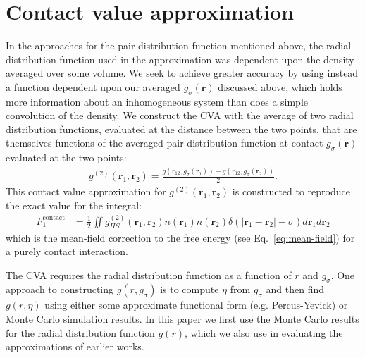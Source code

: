 \documentclass[letterpaper,twocolumn,amsmath,amssymb,pre,aps,10pt]{revtex4-1}
\newcommand{\rr}{\textbf{r}}
\begin{document}
\section{Contact value approximation}
In the approaches for the pair distribution function mentioned above,
the radial distribution function used in the approximation
was dependent upon the density averaged over some volume.  We seek to
achieve greater accuracy by using instead a function dependent upon
our averaged $g_{\sigma}(\rr)$ discussed above, which holds more
information about an inhomogeneous system than does a simple
convolution of the density.
%
We construct the CVA with the average of two radial distribution
functions, evaluated at the distance between the two points, that are
themselves functions of the averaged pair distribution function at contact
$g_{\sigma}(\rr)$ evaluated at the two points:
%
\begin{align}
  g^{(2)}(\rr_1,\rr_2) = \frac{g(r_{12}, g_\sigma(\rr_1)) +
    g(r_{12}, g_\sigma(\rr_2))}{2}. \label{eq:g2-our-mean}
\end{align}
This contact value approximation for $g^{(2)}(\rr_1,\rr_2)$ is
constructed to reproduce the exact value for the integral:
\begin{align}
  F_1^{\text{contact}} &= \tfrac12 \iint
  g^{(2)}_{HS}(\rr_1,\rr_2)n(\rr_1)n(\rr_2)\delta(|\rr_1-\rr_2|-\sigma)
  d\rr_1d\rr_2
  \label{eq:mean-field-contact}
\end{align}
which is the mean-field correction to the free energy (see
Eq.~\ref{eq:mean-field}) for a purely contact interaction.

The CVA requires the radial distribution function as a function of $r$
and $g_\sigma$.  One approach to constructing $g(r,g_\sigma)$ is to
compute $\eta$ from $g_\sigma$ and then find $g(r,\eta)$ using either
some approximate functional form (e.g. Percus-Yevick) or Monte Carlo
simulation results.  In this paper we first use the Monte Carlo
results for the radial distribution function $g(r)$, which we also use
in evaluating the approximations of earlier works.

\newcommand\kappaO{\kappa_0}
\newcommand\kappaI{\kappa_1}
\newcommand\kappaZ{\kappa_2}


\end{document}
